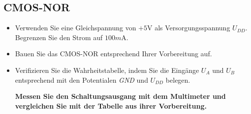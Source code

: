 \documentclass[10pt]{scrreprt}
\begin{document}
    \subsection{CMOS-NOR}
    \begin{itemize}
        \item Verwenden Sie eine Gleichspannung von $+5\si{\volt}$ als Versorgungsspannung $U_{DD}$.
            Begrenzen Sie den Strom auf $100\si{m\ampere}$.
        \item Bauen Sie das CMOS-NOR entsprechend Ihrer Vorbereitung auf.
        \item Verifizieren Sie die Wahrheitstabelle, indem Sie die Eingänge $U_A$ und $U_B$
            entsprechend mit den Potentialen \textit{GND} und $U_{DD}$ belegen.

            \vspace{0.1cm}

            \textbf{
                Messen Sie den Schaltungsausgang mit dem Multimeter und vergleichen
                Sie mit der Tabelle aus ihrer Vorbereitung.
            }
    \end{itemize}
\end{document}
